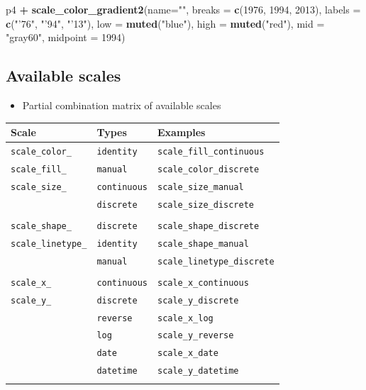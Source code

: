 \documentclass[]{book}
\newenvironment{Shaded}{\begin{snugshade}}{\end{snugshade}}
\newcommand{\KeywordTok}[1]{\textcolor[rgb]{0.13,0.29,0.53}{\textbf{#1}}}
\newcommand{\DataTypeTok}[1]{\textcolor[rgb]{0.13,0.29,0.53}{#1}}
\newcommand{\DecValTok}[1]{\textcolor[rgb]{0.00,0.00,0.81}{#1}}
\newcommand{\StringTok}[1]{\textcolor[rgb]{0.31,0.60,0.02}{#1}}
\newcommand{\OperatorTok}[1]{\textcolor[rgb]{0.81,0.36,0.00}{\textbf{#1}}}
\newcommand{\NormalTok}[1]{#1}
\providecommand{\tightlist}{%
  \setlength{\itemsep}{0pt}\setlength{\parskip}{0pt}}
\begin{document}
\begin{Shaded}
\begin{Highlighting}[]
\NormalTok{p4 }\OperatorTok{+}
\StringTok{  }\KeywordTok{scale_color_gradient2}\NormalTok{(}\DataTypeTok{name=}\StringTok{""}\NormalTok{,}
                        \DataTypeTok{breaks =} \KeywordTok{c}\NormalTok{(}\DecValTok{1976}\NormalTok{, }\DecValTok{1994}\NormalTok{, }\DecValTok{2013}\NormalTok{),}
                        \DataTypeTok{labels =} \KeywordTok{c}\NormalTok{(}\StringTok{"'76"}\NormalTok{, }\StringTok{"'94"}\NormalTok{, }\StringTok{"'13"}\NormalTok{),}
                        \DataTypeTok{low =} \KeywordTok{muted}\NormalTok{(}\StringTok{"blue"}\NormalTok{),}
                        \DataTypeTok{high =} \KeywordTok{muted}\NormalTok{(}\StringTok{"red"}\NormalTok{),}
                        \DataTypeTok{mid =} \StringTok{"gray60"}\NormalTok{,}
                        \DataTypeTok{midpoint =} \DecValTok{1994}\NormalTok{)}
\end{Highlighting}
\end{Shaded}

\subsection{Available scales}\label{available-scales}

\begin{itemize}
\tightlist
\item
  Partial combination matrix of available scales
\end{itemize}

\begin{longtable}[]{@{}lll@{}}
\toprule
\textbf{Scale} & \textbf{Types} & \textbf{Examples}\tabularnewline
\midrule
\endhead
\texttt{scale\_color\_} & \texttt{identity} &
\texttt{scale\_fill\_continuous}\tabularnewline
\texttt{scale\_fill\_} & \texttt{manual} &
\texttt{scale\_color\_discrete}\tabularnewline
\texttt{scale\_size\_} & \texttt{continuous} &
\texttt{scale\_size\_manual}\tabularnewline
& \texttt{discrete} & \texttt{scale\_size\_discrete}\tabularnewline
& &\tabularnewline
\texttt{scale\_shape\_} & \texttt{discrete} &
\texttt{scale\_shape\_discrete}\tabularnewline
\texttt{scale\_linetype\_} & \texttt{identity} &
\texttt{scale\_shape\_manual}\tabularnewline
& \texttt{manual} & \texttt{scale\_linetype\_discrete}\tabularnewline
& &\tabularnewline
\texttt{scale\_x\_} & \texttt{continuous} &
\texttt{scale\_x\_continuous}\tabularnewline
\texttt{scale\_y\_} & \texttt{discrete} &
\texttt{scale\_y\_discrete}\tabularnewline
& \texttt{reverse} & \texttt{scale\_x\_log}\tabularnewline
& \texttt{log} & \texttt{scale\_y\_reverse}\tabularnewline
& \texttt{date} & \texttt{scale\_x\_date}\tabularnewline
& \texttt{datetime} & \texttt{scale\_y\_datetime}\tabularnewline
& &\tabularnewline
\bottomrule
\end{longtable}
\end{document}

